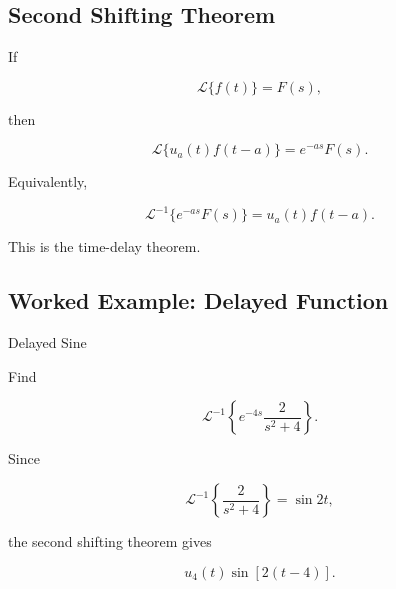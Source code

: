 
\subsection{Second Shifting Theorem}
\label{subsec:second-shifting-theorem}

If

\[
\mathcal{L}\{f(t)\}
=
F(s),
\]

then

\[
\boxed{
\mathcal{L}
\{
u_a(t)
f(t-a)
\}
=
e^{-as}
F(s).
}
\]

Equivalently,

\[
\boxed{
\mathcal{L}^{-1}
\{
e^{-as}F(s)
\}
=
u_a(t)
f(t-a).
}
\]

This is the time-delay theorem.

\subsection{Worked Example: Delayed Function}
\label{subsec:worked-delayed-function}

\begin{workedexamplebox}{Delayed Sine}

Find

\[
\mathcal{L}^{-1}
\left\{
e^{-4s}
\frac{
2
}{
s^2+4
}
\right\}.
\]

Since

\[
\mathcal{L}^{-1}
\left\{
\frac2{s^2+4}
\right\}
=
\sin2t,
\]

the second shifting theorem gives

\begin{answerbox}
\[
\boxed{
u_4(t)
\sin
\left[
2(t-4)
\right].
}
\]
\end{answerbox}

\end{workedexamplebox}

